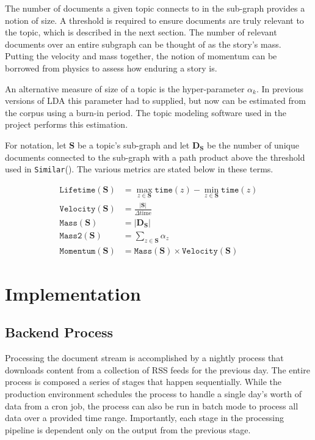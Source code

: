 \documentclass[10pt]{article}
\begin{document}
The number of documents a given topic connects to in the sub-graph provides a notion of size.  A threshold is required to ensure documents are truly relevant to the topic, which is described in the next section.  The number of relevant documents over an entire subgraph can be thought of as the story's mass. Putting the velocity and mass together, the notion of momentum can be borrowed from physics to assess how enduring a story is. 

An alternative measure of size of a topic is the hyper-parameter $\alpha_k$.  In previous versions of LDA this parameter had to supplied, but now can be estimated from the corpus using a burn-in period.  The topic modeling software used in the project performs this estimation.

For notation, let $\mathbf{S}$ be a topic's sub-graph and let $\mathbf{D}_\mathbf{S}$ be the number of unique documents connected to the sub-graph with a path product above the threshold used in \texttt{Similar}().  The various metrics are stated below in these terms.

\begin{align}
\texttt{Lifetime}(\mathbf{S}) &=\max_{z \in \mathbf{S}} \texttt{time}(z) - \min_{z \in \mathbf{S}}\texttt{time}(z) \\
\texttt{Velocity}(\mathbf{S}) &= \frac{|\mathbf{S}|}{\Delta \text{time}} \\
\texttt{Mass}(\mathbf{S}) & = |\mathbf{D}_\mathbf{S}| \\
\texttt{Mass2}(\mathbf{S}) & = \sum_{z \in \mathbf{S}} \alpha_z\\
\texttt{Momentum}(\mathbf{S}) &= \texttt{Mass}(\mathbf{S}) \times \texttt{Velocity}(\mathbf{S})
\end{align}

\section {Implementation}
\subsection {Backend Process}
Processing the document stream is accomplished by a nightly process that downloads content from a collection of RSS feeds for the previous day.  The entire process is composed a series of stages that happen sequentially.  While the production environment schedules the process to handle a single day's worth of data from a cron job, the process can also be run in batch mode to process all data over a provided time range.  Importantly, each stage in the processing pipeline is dependent only on the output from the previous stage.
\end{document}
